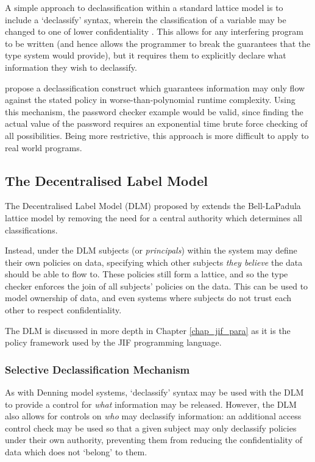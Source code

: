 A simple approach to declassification within a standard lattice model is to include a `declassify' syntax, wherein the classification of a variable may be changed to one of lower confidentiality \cite{denning1974declassification}. This allows for any interfering program to be written (and hence allows the programmer to break the guarantees that the type system would provide), but it requires them to explicitly declare what information they  wish to declassify.

\citeauthor{volpano2000declassification} \cite{volpano2000declassification} propose a declassification construct which guarantees information may only flow against the stated policy in worse-than-polynomial runtime complexity. Using this mechanism, the password checker example would be valid, since finding the actual value of the password requires an exponential time brute force checking of all possibilities. Being more restrictive, this approach is more difficult to apply to real world programs.

\subsection{The Decentralised Label Model} \label{theory_if_dlm}

The Decentralised Label Model (DLM) proposed by \citeauthor{myers1997if} \cite{myers1997if} extends the Bell-LaPadula lattice model by removing the need for a central authority which determines all classifications.

Instead, under the DLM subjects (or \textit{principals}) within the system may define their own policies on data, specifying which other subjects \textit{they believe} the data should be able to flow to. These policies still form a lattice, and so the type checker enforces the join of all subjects' policies on the data. This can be used to model ownership of data, and even systems where subjects do not trust each other to respect confidentiality.

The DLM is discussed in more depth in Chapter \ref{chap_jif_para} as it is the policy framework used by the JIF programming language.

\subsubsection{Selective Declassification Mechanism}

As with Denning model systems, `declassify' syntax may be used with the DLM to provide a control for \textit{what} information may be released. However, the DLM also allows for controls on \textit{who} may declassify information: an additional access control check may be used so that a given subject may only declassify policies under their own authority, preventing them from reducing the confidentiality of data which does not `belong' to them.

